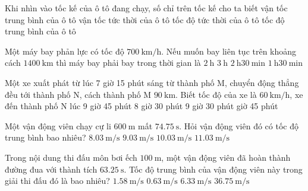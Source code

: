 \begin{ex}
	Khi nhìn vào tốc kế của ô tô đang chạy, số chỉ trên tốc kế cho ta biết
	\choice
	{vận tốc trung bình  của ô tô}
	{vận tốc tức thời của ô tô}
	{\True tốc độ tức thời của ô tô}
	{tốc độ trung bình của ô tô}
	\loigiai{
	}
\end{ex}

\begin{ex}
	Một máy bay phản lực có tốc độ $\SI{700}{\kilo\meter/\hour}$. Nếu muốn bay liên tục trên khoảng cách $\SI{1400}{\kilo\meter}$ thì máy bay phải bay trong thời gian là
	\choice
	{\True $\SI{2}{\hour}$}
	{$\SI{3}{\hour}$}
	{$\SI{2}{\hour}\SI{30}{\minute}$}
	{$\SI{1}{\hour}\SI{30}{\minute}$}
\end{ex}

\begin{ex}
	Một xe xuất phát từ lúc 7 giờ 15 phút sáng từ thành phố M, chuyển động thẳng đều tới thành phố N, cách thành phố M $\SI{90}{\kilo\meter}$. Biết tốc độ của xe là $\SI{60}{\kilo\meter/\hour}$, xe đến thành phố N lúc
	\choice
	{9 giờ 45 phút}
	{8 giờ 30 phút}
	{9 giờ 30 phút}
	{ giờ 45 phút}
\end{ex}

\begin{ex}
	Một vận động viên chạy cự li $\SI{600}{\meter}$ mất $\SI{74.75}{\second}$. Hỏi vận động viên đó có tốc độ trung bình bao nhiêu?
	\choice
	{\True $\SI{8.03}{\meter/\second}$}
	{$\SI{9.03}{\meter/\second}$}
	{$\SI{10.03}{\meter/\second}$}
	{$\SI{11.03}{\meter/\second}$}
\end{ex}

\begin{ex}
	Trong nội dung thi đấu môn bơi ếch $\SI{100}{\meter}$, một vận động viên đã hoàn thành đường đua với thành tích $\SI{63.25}{\second}$. Tốc độ trung bình của vận động viên này trong giải thi đấu đó là bao nhiêu?
	\choice
	{\True $\SI{1.58}{\meter/\second}$}
	{$\SI{0.63}{\meter/\second}$}
	{$\SI{6.33}{\meter/\second}$}
	{$\SI{36.75}{\meter/\second}$}
\end{ex}

